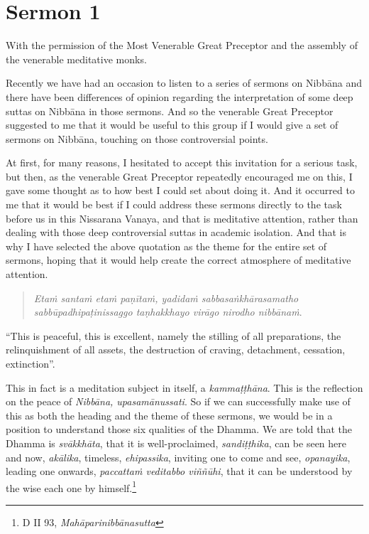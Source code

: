 \chapter{Sermon 1}

\NibbanaOpeningQuote

With the permission of the Most Venerable Great Preceptor and the assembly of the venerable meditative monks.

Recently we have had an occasion to listen to a series of sermons on Nibbāna and there have been differences of opinion regarding the interpretation of some deep suttas on Nibbāna in those sermons. And so the venerable Great Preceptor suggested to me that it would be useful to this group if I would give a set of sermons on Nibbāna, touching on those controversial points.

At first, for many reasons, I hesitated to accept this invitation for a serious task, but then, as the venerable Great Preceptor repeatedly encouraged me on this, I gave some thought as to how best I could set about doing it. And it occurred to me that it would be best if I could address these sermons directly to the task before us in this Nissarana Vanaya, and that is meditative attention, rather than dealing with those deep controversial suttas in academic isolation. And that is why I have selected the above quotation as the theme for the entire set of sermons, hoping that it would help create the correct atmosphere of meditative attention.

\begin{quote}
\emph{Etaṁ santaṁ etaṁ paṇītaṁ, yadidaṁ sabbasaṅkhārasamatho sabbūpadhipaṭinissaggo taṇhakkhayo virāgo nirodho nibbānaṁ}.
\end{quote}

``This is peaceful, this is excellent, namely the stilling of all preparations, the relinquishment of all assets, the destruction of craving, detachment, cessation, extinction''.

This in fact is a meditation subject in itself, a \emph{kammaṭṭhāna}. This is the reflection on the peace of \emph{Nibbāna, upasamānussati}. So if we can successfully make use of this as both the heading and the theme of these sermons, we would be in a position to understand those six qualities of the Dhamma. We are told that the Dhamma is \emph{svākkhāta}, that it is well-proclaimed, \emph{sandiṭṭhika}, can be seen here and now, \emph{akālika}, timeless, \emph{ehipassika}, inviting one to come and see, \emph{opanayika}, leading one onwards, \emph{paccattaṁ veditabbo viññūhi}, that it can be understood by the wise each one by himself.\footnote{D II 93, \emph{Mahāparinibbānasutta}}

